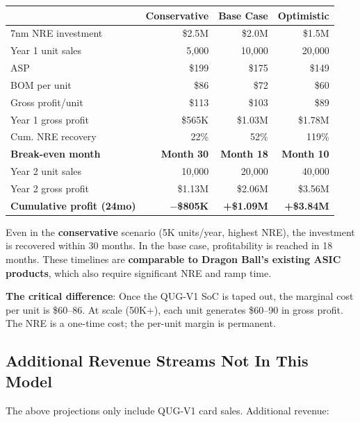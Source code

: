 \documentclass[11pt,a4paper]{article}
\begin{document}
\begin{center}
\begin{tabular}{@{}p{3.5cm}rrr@{}}
\toprule
 & \textbf{Conservative} & \textbf{Base Case} & \textbf{Optimistic} \\
\midrule
7nm NRE investment & \$2.5M & \$2.0M & \$1.5M \\
Year 1 unit sales & 5{,}000 & 10{,}000 & 20{,}000 \\
ASP & \$199 & \$175 & \$149 \\
BOM per unit & \$86 & \$72 & \$60 \\
Gross profit/unit & \$113 & \$103 & \$89 \\
\midrule
Year 1 gross profit & \$565K & \$1.03M & \$1.78M \\
Cum. NRE recovery & 22\% & 52\% & 119\% \\
\textbf{Break-even month} & \textbf{Month 30} & \textbf{Month 18} & \textbf{Month 10} \\
\midrule
Year 2 unit sales & 10{,}000 & 20{,}000 & 40{,}000 \\
Year 2 gross profit & \$1.13M & \$2.06M & \$3.56M \\
\textbf{Cumulative profit (24mo)} & \textbf{$-$\$805K} & \textbf{+\$1.09M} & \textbf{+\$3.84M} \\
\bottomrule
\end{tabular}
\end{center}

\begin{keyinsight}
Even in the \textbf{conservative} scenario (5K units/year, highest NRE), the investment is recovered within 30 months. In the base case, profitability is reached in 18 months. These timelines are \textbf{comparable to Dragon Ball's existing ASIC products}, which also require significant NRE and ramp time.

\textbf{The critical difference}: Once the QUG-V1 SoC is taped out, the marginal cost per unit is \$60--86. At scale (50K+), each unit generates \$60--90 in gross profit. The NRE is a one-time cost; the per-unit margin is permanent.
\end{keyinsight}

\subsection{Additional Revenue Streams Not In This Model}

The above projections only include QUG-V1 card sales. Additional revenue:
\end{document}
